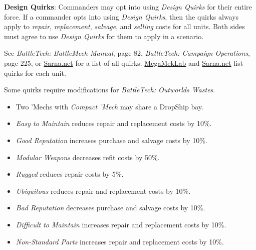\item {\bfseries Design Quirks}: Commanders may opt into using \emph{Design Quirks} for their entire force.
If a commander opts into using \emph{Design Quirks}, then the quirks always apply to \emph{repair}, \emph{replacement}, \emph{salvage}, and \emph{selling} costs for all units.
Both sides must agree to use \emph{Design Quirks} for them to apply in a scenario.

See \emph{BattleTech: BattleMech Manual}, page 82, \emph{BattleTech: Campaign Operations}, page 225, or \href{https://sarna.net}{Sarna.net} for a list of all quirks.
\href{https://megamek.org}{MegaMekLab} and \href{https://sarna.net}{Sarna.net} list quirks for each unit.

Some quirks require modifications for \emph{BattleTech: Outworlds Wastes}.

\begin{itemize}

\item Two 'Mechs with \emph{Compact 'Mech} may share a DropShip bay.

\item \emph{Easy to Maintain} reduces repair and replacement costs by 10\%.

\item \emph{Good Reputation} increases purchase and salvage costs by 10\%.

\item \emph{Modular Weapons} decreases refit costs by 50\%.

\item \emph{Rugged} reduces repair costs by 5\%.

\item \emph{Ubiquitous} reduces repair and replacement costs by 10\%.

\item \emph{Bad Reputation} decreases purchase and salvage costs by 10\%.

\item \emph{Difficult to Maintain} increases repair and replacement costs by 10\%.

\item \emph{Non-Standard Parts} increases repair and replacement costs by 10\%.

\end{itemize}
